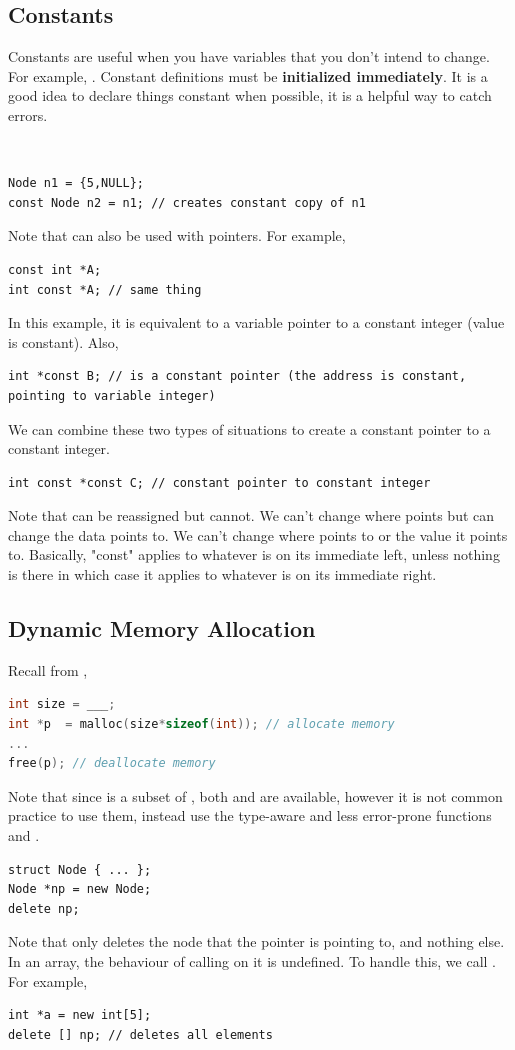 \documentclass[english, 11pt]{article}
\begin{document}
\subsection{Constants}

Constants are useful when you have variables that you don't intend to change. For example, . Constant definitions must be \textbf{initialized immediately}. It is a good idea to declare things constant when possible, it is a helpful way to catch errors.

\begin{exmp} \
  \begin{lstlisting}
Node n1 = {5,NULL};
const Node n2 = n1; // creates constant copy of n1
  \end{lstlisting}
\end{exmp}

Note that  can also be used with pointers. For example,
\begin{lstlisting}
const int *A;
int const *A; // same thing
\end{lstlisting}
In this example, it is equivalent to a variable pointer to a constant integer (value is constant). Also,
\begin{lstlisting}
int *const B; // is a constant pointer (the address is constant, pointing to variable integer)
\end{lstlisting}
We can combine these two types of situations to create a constant pointer to a constant integer.
\begin{lstlisting}
int const *const C; // constant pointer to constant integer
\end{lstlisting}
Note that  can be reassigned but  cannot. We can't change where  points but can change the data  points to. We can't change where  points to or the value it points to. Basically, "const" applies to whatever is on its immediate left, unless nothing is there in which case it applies to whatever is on its immediate right.

\subsection{Dynamic Memory Allocation}
Recall from ,
\begin{lstlisting}[language=C]
int size = ___;
int *p  = malloc(size*sizeof(int)); // allocate memory
...
free(p); // deallocate memory
\end{lstlisting}
Note that since  is a subset of , both  and  are available, however it is not common practice to use them, instead use the type-aware and less error-prone functions  and .
\begin{lstlisting}
struct Node { ... };
Node *np = new Node;
delete np;
\end{lstlisting}
Note that  only deletes the node that the pointer is pointing to, and nothing else. In an array, the behaviour of calling  on it is undefined. To handle this, we call . For example,
\begin{lstlisting}
int *a = new int[5];
delete [] np; // deletes all elements
\end{lstlisting}
\end{document}
